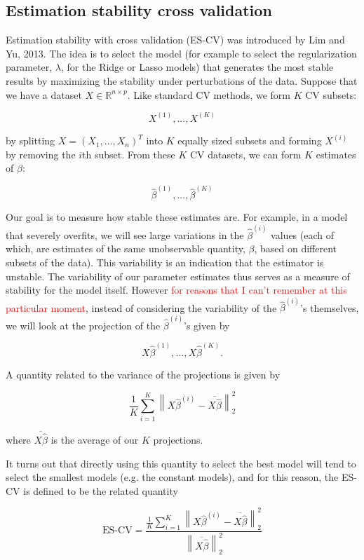 \subsection*{Estimation stability cross validation}

Estimation stability with cross validation (ES-CV) was introduced by Lim and Yu, 2013. The idea is to select the model (for example to select the regularization parameter, $\lambda$, for the Ridge or Lasso models) that generates the most stable results by maximizing the stability under perturbations of the data. Suppose that we have a dataset $X \in \mathbb{R}^{n \times p}$. Like standard CV methods, we form $K$ CV subsets:

$$X^{(1)}, ..., X^{(K)}$$

by splitting $X = (X_1, ..., X_n)^T$ into $K$ equally sized subsets and forming $X^{(i)}$ by removing the $i$th subset. From these $K$ CV datasets, we can form $K$ estimates of $\beta$:

$$\hat{\beta}^{(1)}, ..., \hat{\beta}^{(K)}$$

Our goal is to measure how stable these estimates are. For example, in a model that severely overfits, we will see large variations in the $\hat{\beta}^{(i)}$ values (each of which, are estimates of the same unobservable quantity, $\beta$, based on different subsets of the data). This variability is an indication that the estimator is unstable. The variability of our parameter estimates thus serves as a measure of stability for the model itself. However \textcolor{red}{for reasons that I can't remember at this particular moment}, instead of considering the variability of the $\hat{\beta}^{(i)}$'s themselves, we will look at the projection of the $\hat{\beta}^{(i)}$'s given by

$$X \hat{\beta}^{(1)}, ..., X \hat{\beta}^{(K)}.$$


A quantity related to the variance of the projections is given by

$$\frac{1}{K} \sum_{i = 1}^K \left \| X \hat{\beta}^{(i)} - \overline{X \hat{\beta}} \right\|_2^2$$

where $\overline{X \hat{\beta}}$ is the average of our $K$ projections. 

It turns out that directly using this quantity to select the best model will tend to select the smallest models (e.g. the constant models), and for this reason, the ES-CV is defined to be the related quantity

$$\text{ES-CV} = \frac{\frac{1}{K} \sum_{i = 1}^K \left \| X \hat{\beta}^{(i)} - \overline{X \hat{\beta}} \right\|_2^2}{ \left\|\overline{X \hat{\beta}} \right\|_2^2}$$

